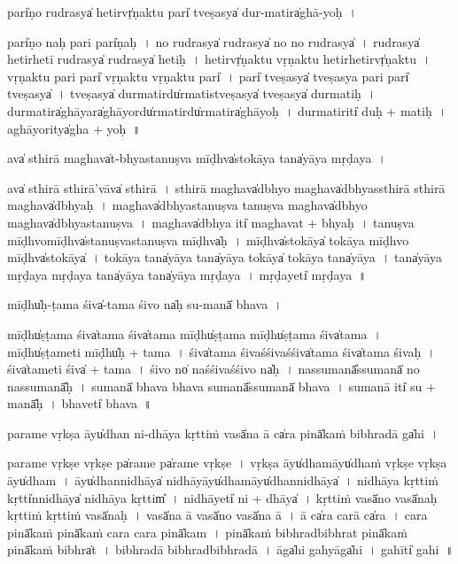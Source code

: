 \documentclass[parskip, DIV=14]{scrartcl}
\begin{document}
{pari̍ṇo ru॒drasya̍ he॒tirvṛ̍ṇaktu॒ pari̍ tve॒ṣasya̍ dur-ma॒tira̍ghā॒-yoḥ~।

pari̍ṇo na॒ḥ pari॒ pari̍ṇaḥ~।
no॒ ru॒drasya̍ ru॒drasya̍ no no ru॒drasya̍~।
ru॒drasya̍ he॒tirhe॒tī ru॒drasya̍ ru॒drasya̍ he॒tiḥ~।
he॒tirvṛ̍ṇaktu vṛṇaktu he॒tirhe॒tirvṛ̍ṇaktu~।
vṛ॒ṇa॒ktu॒ pari॒ pari̍ vṛṇaktu vṛṇaktu॒ pari̍~।
pari̍ tve॒ṣasya̍ tve॒ṣasya॒ pari॒ pari̍ tve॒ṣasya̍~।
tve॒ṣasya̍ durma॒tirdu̍rma॒tistve॒ṣasya̍ tve॒ṣasya̍ durma॒tiḥ~।
du॒rma॒tira̍ghā॒yara̍ghā॒yordu̍rma॒tirdu̍rma॒tira̍ghā॒yoḥ~।
du॒rma॒tiriti̍ duḥ  + ma॒tiḥ~।
a॒ghā॒yoritya̍gha + yoḥ~॥ 

ava̍ sthi॒rā ma॒ghava̍t-bhyastanuṣva॒ mīḍhva̍sto॒kāya॒ tana̍yāya mṛḍaya~।

ava̍ sthi॒rā sthi॒rā'vāva̍ sthi॒rā~।
sthi॒rā ma॒ghava̍dbhyo ma॒ghava̍dbhyassthi॒rā sthi॒rā ma॒ghava̍dbhyaḥ~।
ma॒ghava̍dbhyastanuṣva tanuṣva ma॒ghava̍dbhyo ma॒ghava̍dbhyastanuṣva~।
ma॒ghava̍dbhya॒ iti̍ ma॒ghavat + bhya॒ḥ॒~।
ta॒nu॒ṣva॒ mīḍhvo॒mīḍhva̍stanuṣvastanuṣva॒ mīḍhva̍ḥ~।
mīḍhva̍sto॒kāya̍ to॒kāya॒ mīḍhvo॒ mīḍhva̍sto॒kāya̍~।
to॒kāya॒ tana̍yāya॒ tana̍yāya to॒kāya̍ to॒kāya॒ tana̍yāya~।
tana̍yāya mṛḍaya mṛḍaya॒ tana̍yāya॒ tana̍yāya mṛḍaya~।
mṛ॒ḍa॒yeti̍ mṛḍaya~॥ 

mīḍhu̍ḥ-ṭama॒ śiva̍-tama śi॒vo na̍ḥ su॒-manā̍ bhava~।

mīḍhu̍ṣṭama॒ śiva̍tama॒ śiva̍tama॒ mīḍhu̍ṣṭama॒ mīḍhu̍ṣṭama॒ śiva̍tama~।
mīḍhu̍ṣṭa॒meti॒ mīḍhu̍ḥ + ta॒ma॒~।
śiva̍tama śi॒vaśśi॒vaśśiva̍tama॒ śiva̍tama śi॒vaḥ~।
śiva̍ta॒meti॒ śiva̍ + ta॒ma॒~।
śi॒vo no̍ naśśi॒vaśśi॒vo na̍ḥ~।
na॒ssu॒manā̎ssu॒manā̍ no nassu॒manā̎ḥ~।
su॒manā̍ bhava bhava su॒manā̎ssu॒manā̍ bhava~।
su॒manā॒ iti̍ su + manā̎ḥ~।
bha॒veti̍ bhava~॥ 

pa॒ra॒me vṛ॒kṣa āyu̍dhan ni-dhāya॒ kṛttiṁ vasā̍na॒ ā ca̍ra॒ pinā̍ka॒ṁ bibhra॒dā ga̍hi~।

pa॒ra॒me vṛ॒kṣe vṛ॒kṣe pa̍ra॒me pa̍ra॒me vṛ॒kṣe~।
vṛ॒kṣa āyu̍dha॒māyu̍dhaṁ vṛ॒kṣe vṛ॒kṣa āyu̍dham~।
āyu̍dhanni॒dhāya̍ ni॒dhāyāyu̍dha॒māyu̍dhanni॒dhāya̍~।
ni॒dhāya॒ kṛtti॒ṁ kṛtti̍nni॒dhāya̍ ni॒dhāya॒ kṛttim̎~।
ni॒dhāyeti̍ ni + dhāya̍~।
kṛtti॒ṁ vasā̍no॒ vasā̍na॒ḥ  kṛtti॒ṁ kṛtti॒ṁ vasā̍naḥ~।
vasā̍na॒ ā vasā̍no॒ vasā̍na॒ ā~।
ā ca̍ra ca॒rā ca̍ra~।
ca॒ra॒ pinā̍ka॒ṁ pinā̍kaṁ cara cara॒ pinā̍kam~।
pinā̍ka॒ṁ bibhra॒dbibhra॒t pinā̍ka॒ṁ pinā̍ka॒ṁ bibhra̍t~।
bibhra॒dā bibhra॒dbibhra॒dā~।
āga̍hi ga॒hyāga̍hi~।
gahīti̍ gahi~॥ 

}
\end{document}
